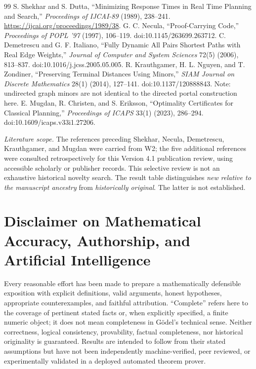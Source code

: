 \documentclass[11pt,letterpaper]{article}
\begin{document}
\begin{thebibliography}{99}
 S. Shekhar and S. Dutta, ``Minimizing Response Times in Real Time Planning and Search,'' \emph{Proceedings of IJCAI-89} (1989), 238--241. \url{https://ijcai.org/proceedings/1989/38}.
 G. C. Necula, ``Proof-Carrying Code,'' \emph{Proceedings of POPL '97} (1997), 106--119. doi:10.1145/263699.263712.
 C. Demetrescu and G. F. Italiano, ``Fully Dynamic All Pairs Shortest Paths with Real Edge Weights,'' \emph{Journal of Computer and System Sciences} 72(5) (2006), 813--837. doi:10.1016/j.jcss.2005.05.005.
 R. Krauthgamer, H. L. Nguyen, and T. Zondiner, ``Preserving Terminal Distances Using Minors,'' \emph{SIAM Journal on Discrete Mathematics} 28(1) (2014), 127--141. doi:10.1137/120888843. Note: undirected graph minors are not identical to the directed portal construction here.
 E. Mugdan, R. Christen, and S. Eriksson, ``Optimality Certificates for Classical Planning,'' \emph{Proceedings of ICAPS} 33(1) (2023), 286--294. doi:10.1609/icaps.v33i1.27206.

\end{thebibliography}
\noindent\textit{Literature scope.} The references preceding Shekhar, Necula, Demetrescu, Krauthgamer, and Mugdan were carried from W2; the five additional references were consulted retrospectively for this Version 4.1 publication review, using accessible scholarly or publisher records. This selective review is not an exhaustive historical novelty search. The result table distinguishes \emph{new relative to the manuscript ancestry} from \emph{historically original}. The latter is not established.

\clearpage
\section*{Disclaimer on Mathematical Accuracy, Authorship, and Artificial Intelligence}
\noindent Every reasonable effort has been made to prepare a mathematically defensible exposition with explicit definitions, valid arguments, honest hypotheses, appropriate counterexamples, and faithful attribution. ``Complete'' refers here to the coverage of pertinent stated facts or, when explicitly specified, a finite numeric object; it does not mean completeness in G\"odel's technical sense. Neither correctness, logical consistency, provability, factual completeness, nor historical originality is guaranteed. Results are intended to follow from their stated assumptions but have not been independently machine-verified, peer reviewed, or experimentally validated in a deployed automated theorem prover.
\end{document}
